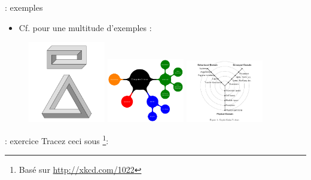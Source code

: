 \documentclass{beamer}
\begin{document}
\begin{frame}[fragile]{\insertsection: exemples}
\begin{itemize}
\item Cf.  pour une multitude d'exemples \tikzname{} :
\end{itemize}
\begin{figure}
\href{http://texample.net/tikz/examples/escher-brick-penrose-triangle/}{%
  \includegraphics[width=0.3\textwidth]{escher-brick-penrose-triangle}}
\href{http://texample.net/tikz/examples/computer-science-mindmap/}{%
  \includegraphics[width=0.3\textwidth]{computer-science-mindmap}}
\href{http://texample.net/tikz/examples/gajski-kuhn-y-chart/}{%
  \includegraphics[width=0.3\textwidth]{gajski-kuhn-y-chart}}
\end{figure}
\end{frame}

\begin{frame}[fragile]{\insertsection: exercice}
Tracez ceci sous \tikzname\footnote{Basé sur \url{http://xkcd.com/1022}}:
\begin{figure}

\end{figure}
\end{frame}
\end{document}
